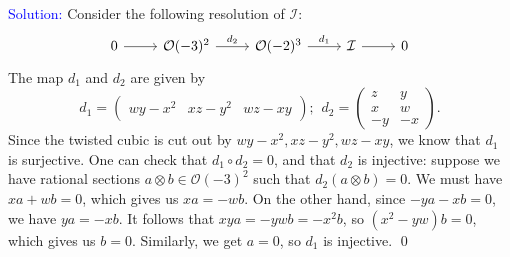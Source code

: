 \documentclass[11pt]{article}
\newcommand{\cI}{\mathcal{I}}
\newcommand{\cO}{\mathcal{O}}
\newenvironment{solution}{\begin{trivlist}\item[]{\textcolor{blue}{Solution:}}}{\qed \end{trivlist}}
\begin{document}
\begin{solution}
    Consider the following resolution of $\cI$: 
	\[\begin{tikzcd}
		0 & {\cO(-3)^2} & {\cO(-2)^3} & \cI & 0
		\arrow[from=1-1, to=1-2]
		\arrow["{d_2}", from=1-2, to=1-3]
		\arrow["{d_1}", from=1-3, to=1-4]
		\arrow[from=1-4, to=1-5]
	\end{tikzcd}\]
	The map $d_1$ and $d_2$ are given by 
	\begin{equation*}
		d_1 = 
		\begin{pmatrix}
			wy - x^2 & xz - y^2 & wz - xy
		\end{pmatrix} ; \hspace{5pt}
		d_2 = 
		\begin{pmatrix}
			z & y \\
			x & w \\
			-y & -x
		\end{pmatrix}.
	\end{equation*}
	Since the twisted cubic is cut out by $wy - x^2, xz - y^2, wz - xy$, we know that $d_1$ is surjective. One can check that $d_1 \circ d_2 = 0$, and that $d_2$ is injective: suppose we have rational sections $a \otimes b \in \cO(-3)^2$ such that $d_2(a \otimes b) = 0$. We must have $xa + wb = 0$, which gives us $xa = -wb$. On the other hand, since $-ya - xb = 0$, we have $ya = -xb$. It follows that $xya = -ywb = -x^2b$, so $(x^2 - yw)b = 0$, which gives us $b = 0$. Similarly, we get $a = 0$, so $d_1$ is injective. 
\end{solution}
\end{document}
